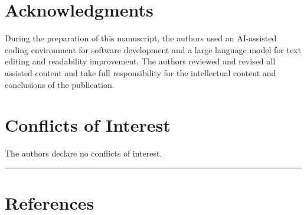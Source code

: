 \documentclass[
  10pt,
  a4paper,
]{article}
\begin{document}
\section{Acknowledgments}\label{acknowledgments}

During the preparation of this manuscript, the authors used an
AI-assisted coding environment for software development and a large
language model for text editing and readability improvement. The authors
reviewed and revised all assisted content and take full responsibility
for the intellectual content and conclusions of the publication.

\section{Conflicts of Interest}\label{conflicts-of-interest}

The authors declare no conflicts of interest.

\begin{center}\rule{0.5\linewidth}{0.5pt}\end{center}

\section{References}\label{references}
\end{document}
